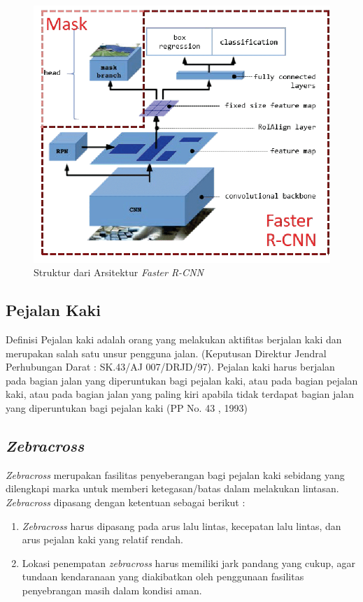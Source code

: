 \begin{figure}[H]
	\centering
	\includegraphics[scale=0.25]{gambar/arch-mask-rcnn.png}
	\caption{Struktur dari Arsitektur \textit{Faster R-CNN} \citep{arch-mask-rcnn}}
	\label{fig:mask-rcnn}
\end{figure}

\subsection{Pejalan Kaki}
\label{subsec:pedestrian}

Definisi Pejalan kaki adalah orang yang melakukan aktifitas berjalan kaki dan merupakan salah satu unsur pengguna jalan. (Keputusan Direktur Jendral Perhubungan Darat : SK.43/AJ 007/DRJD/97). Pejalan kaki harus berjalan pada bagian jalan yang diperuntukan bagi pejalan kaki, atau pada bagian pejalan kaki, atau pada bagian jalan yang paling kiri apabila tidak terdapat bagian jalan yang diperuntukan bagi pejalan kaki (PP No. 43 , 1993)


\subsection{\textit{Zebracross}}
\label{subsec:zebracross}

\textit{Zebracross} merupakan  fasilitas penyeberangan bagi pejalan kaki sebidang yang dilengkapi marka untuk memberi ketegasan/batas dalam melakukan lintasan. \textit{Zebracross} dipasang dengan ketentuan sebagai berikut :
\begin{enumerate}
	\item \textit{Zebracross} harus dipasang pada arus lalu lintas, kecepatan lalu lintas, dan arus pejalan kaki yang relatif rendah.
	\item Lokasi penempatan \textit{zebracross} harus memiliki jark pandang yang cukup, agar tundaan kendaranaan yang diakibatkan oleh penggunaan fasilitas penyebrangan masih dalam kondisi aman. 
\end{enumerate}

